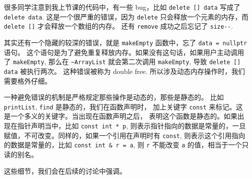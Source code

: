 \documentclass[a4paper]{ctexart}
\theoremstyle{definition}
\theoremstyle{definition}
\begin{document}
很多同学注意到我上节课的代码中，有一些 bug，比如 \verb|delete [] data| 写成了 \verb|delete data|.
这是一个很严重的错误，因为 \verb|delete| 只会释放一个元素的内存，而 \verb|delete []| 才会释放一个数组的内存。
还有 \verb|remove| 成功之后忘记了 \verb|size--|.

其实还有一个隐藏的较深的错误，就是 \verb|makeEmpty| 函数中，忘了 \verb|data = nullptr| 语句。
这个语句是为了避免重复释放内存。如果没有这句话，如果用户主动调用了 \verb|makeEmpty|, 
那么在 \verb|~ArrayList| 就会第二次调用 \verb|makeEmpty|, 导致 \verb|delete [] data| 被执行两次。
这种错误被称为 double free. 所以涉及动态内存操作时，我们需要格外仔细。

一种避免错误的机制是严格规定那些操作是动态的，那些是静态的。
比如 \verb|printList|, \verb|find| 是静态的，我们在函数声明时，
加上关键字 \verb|const| 来标记。这是一个多义的关键字。当出现在函数声明之后，
表明这个函数是静态的。如果出现在指针声明当中，比如 \verb|const int * p|, 
则表示指针指向的数据是常量的，一旦赋值，不可改变。同样的，如果一个引用在声明时有 \verb|const|,
则表示这个引用指向的数据是常量的，比如 
\verb|const int & r = a|, 则 \verb|r| 不能改变 \verb|a| 的值，相当于一个只读的别名。

这些细节，我们会在后续的讨论中强调。
\end{document}
